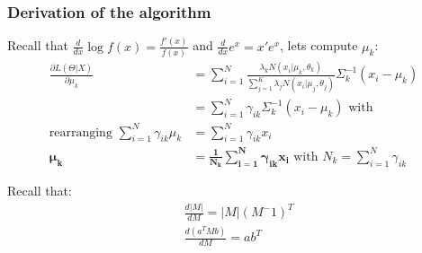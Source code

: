 \documentclass[11pt]{article}
\begin{document}
\subsubsection{Derivation of the algorithm}
Recall that $\frac{d}{dx} \log f(x) = \frac{f'(x)}{f(x)}$ and $\frac{d}{dx} e ^x=x' e^x$, lets compute $\mu _k$:
\begin{align}
\frac{\partial L(\Theta | X)}{\partial\mu _k} &=  \sum_{i=1}^N \frac{\lambda_k N(x_i| \mu _k, \theta _k)}{\sum _{j=1}^K \lambda _j N(x_i| \mu _j, \theta _j)} \Sigma _k^{-1} (x_i-\mu _k) \nonumber\\
&=  \sum_{i=1}^N \gamma _{ik} \Sigma _k^{-1} (x_i-\mu _k) \text{~with ~} \nonumber\\
\text{rearranging~} \sum_{i=1}^N \gamma _{ik} \mu _ k &= \sum_{i=1}^N \gamma _{ik} x_i \nonumber\\
\bm{\mu _ k} &= \bm{\frac{1}{N_k} \sum_{i=1}^N \gamma _{ik} x_i} \text{~with~} N_k = \sum _{i=1}^N \gamma _{ik}
\end{align}

Recall that:
\begin{align*}
& \frac{d|M|}{dM} = |M|(M^-1)^T \\
& \frac{d(a^TMb)}{dM} = ab^T
\end{align*}
\end{document}
